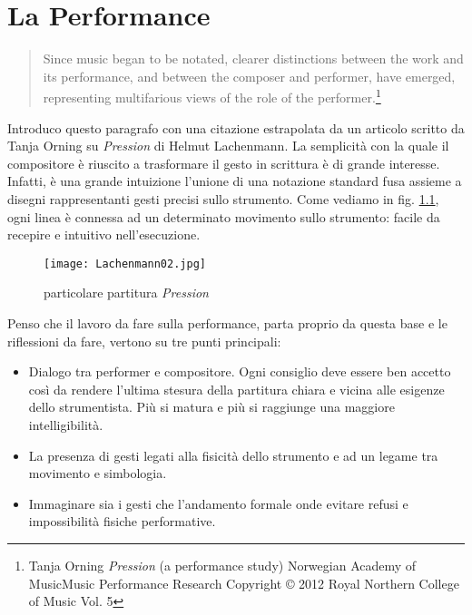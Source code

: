 
\chapter{La Performance}
\label{chp:La Performance}

\begin{quotation}
Since music began to be notated, clearer distinctions between the work and its performance, and between the composer and performer, have emerged, representing multifarious views of the role of the performer.\footnote{Tanja Orning \textit{Pression} (a performance study) Norwegian Academy of MusicMusic Performance Research Copyright © 2012 Royal Northern College of Music Vol. 5}
\end{quotation}

Introduco questo paragrafo con una citazione estrapolata da un articolo scritto da Tanja Orning su \textit{Pression} di Helmut Lachenmann. La semplicità con la quale il compositore è riuscito a trasformare il gesto in scrittura è di grande interesse. Infatti, è una grande intuizione l'unione di una notazione standard fusa assieme a disegni rappresentanti gesti precisi sullo strumento. Come vediamo in fig. \ref{fig:lach02}, ogni linea è connessa ad un determinato movimento sullo strumento: facile da recepire e intuitivo nell'esecuzione. 

\begin{figure}[htbp]
\begin{center}
\texttt{[image: Lachenmann02.jpg]}
\caption{particolare partitura \textit{Pression}}
\label{fig:lach02}
\end{center}
\end{figure}

Penso che il lavoro da fare sulla performance, parta proprio da questa base e le riflessioni da fare, vertono su tre punti principali:

\begin{itemize}
\item{Dialogo tra performer e compositore. Ogni consiglio deve essere ben accetto così da rendere l'ultima stesura della partitura chiara e vicina alle esigenze dello strumentista. Più si matura e più si raggiunge una maggiore intelligibilità.}
\item{La presenza di gesti legati alla fisicità dello strumento e ad un legame tra movimento e simbologia.}
\item{Immaginare sia i gesti che l'andamento formale onde evitare refusi e impossibilità fisiche performative.}
\end{itemize}

